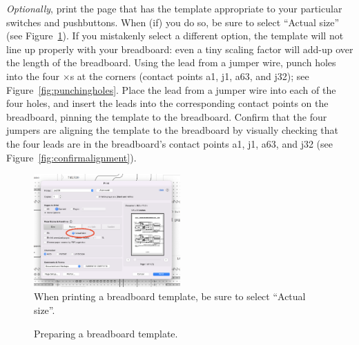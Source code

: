 \textit{Optionally}, print the page that has the template appropriate to your particular switches and pushbuttons.
When (if) you do so, be sure to select ``Actual size'' (see Figure~\ref{fig:printmenu}).
If you mistakenly select a different option, the template will not line up properly with your breadboard: even a tiny scaling factor will add-up over the length of the breadboard.
Using the lead from a jumper wire, punch holes into the four $\times$s at the corners (contact points a1, j1, a63, and j32); see Figure~\ref{fig:punchingholes}.
Place the lead from a jumper wire into each of the four holes, and insert the leads into the corresponding contact points on the breadboard, pinning the template to the breadboard.
Confirm that the four jumpers are aligning the template to the breadboard by visually checking that the four leads are in the breadboard's contact points a1, j1, a63, and j32 (see Figure~\ref{fig:confirmalignment}).

\begin{figure}
    \centering
    \includegraphics[width=0.5\textwidth]{breadboard-guides/print-menu}
    \caption{When printing a breadboard template, be sure to select ``Actual size''.} \label{fig:printmenu}
\end{figure}

\begin{figure}
    \centering
    \hfil
    \caption{Preparing a breadboard template.}
\end{figure}

